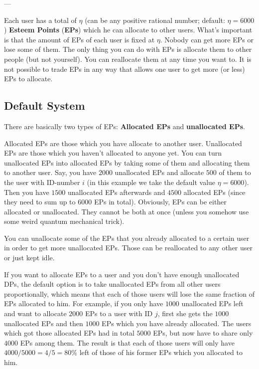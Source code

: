 \documentclass[a4paper,12pt]{scrartcl}
\newcounter{example}
\begin{document}
---

Each user has a total of $\eta$ (can be any positive rational number; default: $\eta = 6000$) \textbf{Esteem Points} (\textbf{EPs}) which he can allocate to other users. 
What's important is that the amount of EPs of each user is fixed at $\eta$. Nobody can get more EPs or lose some of them. The only thing you can do with EPs is allocate them to other people (but not yourself). You can reallocate them at any time you want to. It is not possible to trade EPs in any way that allows one user to get more (or less) EPs to allocate.

\subsection{Default System}
There are basically two types of EPs: \textbf{Allocated EPs} and \textbf{unallocated EPs}.

Allocated EPs are those which you have allocate to another user. Unallocated EPs are those which you haven't allocated to anyone yet. You can turn unallocated EPs into allocated EPs by taking some of them and allocating them to another user. Say, you have $2000$ unallocated EPs and allocate $500$ of them to the user with ID-number $i$ (in this example we take the default value $\eta = 6000$). Then you have $1500$ unallocated EPs afterwards and $4500$ allocated EPs (since they need to sum up to $6000$ EPs in total). Obviously, EPs can be either allocated or unallocated. They cannot be both at once (unless you somehow use some weird quantum mechanical trick).

You can unallocate some of the EPs that you already allocated to a certain user in order to get more unallocated EPs. Those can be reallocated to any other user or just kept idle.

If you want to allocate EPs to a user and you don't have enough unallocated DPs, the default option is to take unallocated EPs from all other users proportionally, which means that each of those users will lose the same fraction of EPs allocated to him. For example, if you only have $1000$ unallocated EPs left and want to allocate $2000$ EPs to a user with ID $j$, first she gets the $1000$ unallocated EPs and then $1000$ EPs which you have already allocated. The users which got those allocated EPs had in total $5000$ EPs, but now have to share only $4000$ EPs among them. The result is that each of those users will only have $4000/5000=4/5=80\%$ left of those of his former EPs which you allocated to him.
\end{document}
